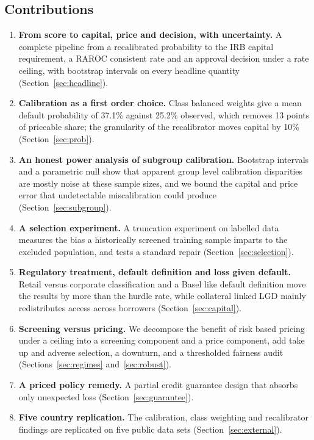 \documentclass[11pt,a4paper]{article}
\begin{document}
\subsection{Contributions}
\begin{enumerate}[label=\textbf{C\arabic*.}]
\item \textbf{From score to capital, price and decision, with uncertainty.} A complete pipeline from a recalibrated probability to the IRB capital requirement, a RAROC consistent rate and an approval decision under a rate ceiling, with bootstrap intervals on every headline quantity (Section~\ref{sec:headline}).
\item \textbf{Calibration as a first order choice.} Class balanced weights give a mean default probability of 37.1\% against 25.2\% observed, which removes 13 points of priceable share; the granularity of the recalibrator moves capital by 10\% (Section~\ref{sec:prob}).
\item \textbf{An honest power analysis of subgroup calibration.} Bootstrap intervals and a parametric null show that apparent group level calibration disparities are mostly noise at these sample sizes, and we bound the capital and price error that undetectable miscalibration could produce (Section~\ref{sec:subgroup}).
\item \textbf{A selection experiment.} A truncation experiment on labelled data measures the bias a historically screened training sample imparts to the excluded population, and tests a standard repair (Section~\ref{sec:selection}).
\item \textbf{Regulatory treatment, default definition and loss given default.} Retail versus corporate classification and a Basel like default definition move the results by more than the hurdle rate, while collateral linked LGD mainly redistributes access across borrowers (Section~\ref{sec:capital}).
\item \textbf{Screening versus pricing.} We decompose the benefit of risk based pricing under a ceiling into a screening component and a price component, add take up and adverse selection, a downturn, and a thresholded fairness audit (Sections~\ref{sec:regimes} and~\ref{sec:robust}).
\item \textbf{A priced policy remedy.} A partial credit guarantee design that absorbs only unexpected loss (Section~\ref{sec:guarantee}).
\item \textbf{Five country replication.} The calibration, class weighting and recalibrator findings are replicated on five public data sets (Section~\ref{sec:external}).
\end{enumerate}
\end{document}
